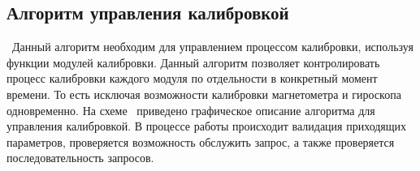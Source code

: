 \subsection{Алгоритм управления калибровкой}
\blockScheme\
Данный алгоритм необходим для управлением процессом калибровки, используя функции модулей калибровки. Данный алгоритм позволяет контролировать
процесс калибровки каждого модуля по отдельности в конкретный момент времени. То есть исключая возможности калибровки магнетометра и гироскопа
одновременно. На схеме \blockScheme\ приведено графическое описание алгоритма для управления калибровкой. В процессе работы происходит валидация
приходящих параметров, проверяется возможность обслужить запрос, а также проверяется последовательность запросов.

